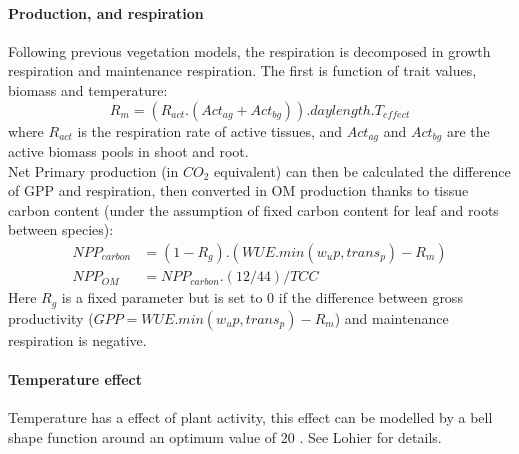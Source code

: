\documentclass[a4paper,twoside, justified,marginals=raggedright, nobib]{tufte-handout}
\begin{document}
\paragraph{Production, and respiration} Following previous vegetation models, the respiration is decomposed in growth respiration and maintenance respiration. The first is function of trait values, biomass and temperature:
\begin{equation}
R_{m} = \left(R_{act}.\left(Act_{ag} + Act_{bg}\right)\right) . daylength . T_{effect}
\end{equation}
where $R_{act}$ is the respiration rate of active tissues, and $Act_{ag}$ and $Act_{bg}$ are the active biomass pools in shoot and root.\\
\indent Net Primary production (in $CO_{2}$ equivalent) can then be calculated the difference of GPP and respiration, then converted in OM production thanks to tissue carbon content (under the assumption of fixed carbon content for leaf and roots between species):
 \begin{align}
 NPP_{carbon} &= (1- R_{g}) . (WUE . min(w_up, trans_p) - R_{m})\\
 NPP_{OM} &= NPP_{carbon} . (12/44) / TCC
\end{align} 
Here $R_{g}$ is a fixed parameter but is set to $0$ if the difference between gross productivity ($GPP = WUE . min(w_up, trans_p) - R_{m}$) and maintenance respiration is negative.

\paragraph{Temperature effect} Temperature has a effect of plant activity, this effect can be modelled by a bell shape function around an optimum value of 20 \celsius . See Lohier for details.
\end{document}
